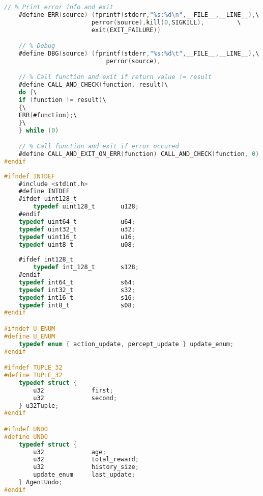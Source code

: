 \documentclass[fancychapters]{report}   	%
\begin{document}
\begin{lstlisting}[language=C,caption={macros.h}]
    // % Print error info and exit
    #define ERR(source) (fprintf(stderr,"%s:%d\n",__FILE__,__LINE__),\
                        perror(source),kill(0,SIGKILL),			\
                        exit(EXIT_FAILURE))

    // % Debug
    #define DBG(source) (fprintf(stderr,"%s:%d\t",__FILE__,__LINE__),\
                            perror(source),

    // % Call function and exit if return value != result
    #define CALL_AND_CHECK(function, result)\
    do {\
    if (function != result)\
    {\
    ERR(#function);\
    }\
    } while (0)

    // % Call function and exit if error occured
    #define CALL_AND_EXIT_ON_ERR(function) CALL_AND_CHECK(function, 0)
#endif
\end{lstlisting}
\begin{lstlisting}[language=C,caption={types.h}]
#ifndef INTDEF
    #include <stdint.h>
    #define INTDEF
    #ifdef uint128_t
        typedef uint128_t       u128;
    #endif
    typedef uint64_t            u64;
    typedef uint32_t            u32;
    typedef uint16_t            u16;
    typedef uint8_t             u08;
    
    #ifdef int128_t
        typedef int_128_t       s128;
    #endif
    typedef int64_t             s64;
    typedef int32_t             s32;
    typedef int16_t             s16;
    typedef int8_t              s08;
#endif

#ifndef U_ENUM
#define U_ENUM
    typedef enum { action_update, percept_update } update_enum;
#endif

#ifndef TUPLE_32
#define TUPLE_32
    typedef struct {
        u32             first;
        u32             second;
    } u32Tuple;
#endif

#ifndef UNDO
#define UNDO
    typedef struct {
        u32             age;
        u32             total_reward;
        u32             history_size;
        update_enum     last_update;
    } AgentUndo;
#endif
\end{lstlisting}

\end{document}
